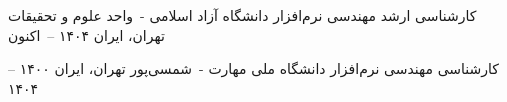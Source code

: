 

\begin{cventries}

  \cventry
    {کارشناسی ارشد مهندسی نرم‌افزار}
    {دانشگاه آزاد اسلامی -\ واحد علوم و تحقیقات}
    {تهران، ایران}
    {۱۴۰۴ --\ اکنون}
    {}

  \cventry
    {کارشناسی مهندسی نرم‌افزار}
    {دانشگاه ملی مهارت -\ شمسی‌پور}
    {تهران، ایران}
    {۱۴۰۰ --\ ۱۴۰۴}
    {}

\end{cventries}

